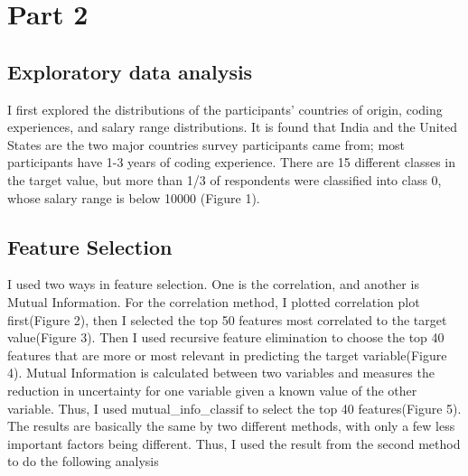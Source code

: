 \documentclass[10pt,onecolumn,letterpaper]{article}
\begin{document}
\section*{Part 2}
\subsection*{Exploratory data analysis}
I first explored the distributions of the participants’ countries of origin, coding experiences, and salary range distributions. It is found that India and the United States are the two major countries survey participants came from; most participants have 1-3 years of coding experience. There are 15 different classes in the target value, but more than 1/3 of respondents were classified into class 0, whose salary range is below 10000 (Figure 1).

\subsection*{Feature Selection}
I used two ways in feature selection. One is the correlation, and another is Mutual Information. For the correlation method, I plotted correlation plot first(Figure 2), then I selected the top 50 features most correlated to the target value(Figure 3). Then I used recursive feature elimination to choose the top 40 features that are more or most relevant in predicting the target variable(Figure 4). Mutual Information is calculated between two variables and measures the reduction in uncertainty for one variable given a known value of the other variable. Thus, I used mutual\_info\_classif to select the top 40 features(Figure 5). The results are basically the same by two different methods, with only a few less important factors being different. Thus, I used the result from the second method to do the following analysis
\end{document}

